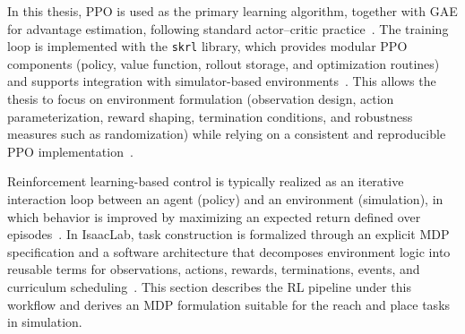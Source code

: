 
\label{sec:policy_learning}

In this thesis, \ac{PPO} is used as the primary learning algorithm, together with \ac{GAE} for advantage estimation, following standard actor--critic practice~\cite{Schulman2015GAE,Schulman2017PPO}. The training loop is implemented with the \texttt{skrl} library, which provides modular \ac{PPO} components (policy, value function, rollout storage, and optimization routines) and supports integration with simulator-based environments~\cite{SerranoMunoz2023skrl}. This allows the thesis to focus on environment formulation (observation design, action parameterization, reward shaping, termination conditions, and robustness measures such as randomization) while relying on a consistent and reproducible \ac{PPO} implementation~\cite{SerranoMunoz2023skrl}.

Reinforcement learning-based control is typically realized as an iterative interaction loop between an agent (policy) and an environment (simulation), in which behavior is improved by maximizing an expected return defined over episodes~\cite{SuttonBarto2018,Puterman1994}. In IsaacLab, task construction is formalized through an explicit \ac{MDP} specification and a software architecture that decomposes environment logic into reusable terms for observations, actions, rewards, terminations, events, and curriculum scheduling~\cite{nvidia_isaaclab_mdp_managers_getting_started,isaaclab_task_design_workflows,isaaclab_mdp_terms_api}. This section describes the \ac{RL} pipeline under this workflow and derives an \ac{MDP} formulation suitable for the reach and place tasks in simulation.